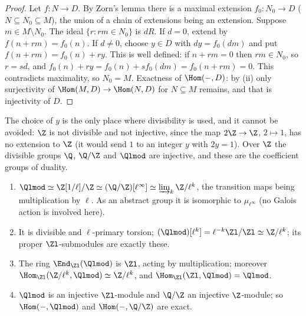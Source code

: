 \begin{proof}
Let $f\colon N\to D$. By Zorn's lemma there is a maximal extension $f_0\colon N_0\to D$ ($N\subseteq N_0\subseteq M$), the union of a chain of
extensions being an extension. Suppose $m\in M\setminus N_0$. The ideal $\{r:rm\in N_0\}$ is $dR$. If $d=0$, extend by $f(n+rm)=f_0(n)$. If
$d\ne0$, choose $y\in D$ with $dy=f_0(dm)$ and put $f(n+rm)=f_0(n)+ry$. This is well defined: if $n+rm=0$ then $rm\in N_0$, so $r=sd$, and
$f_0(n)+ry=f_0(n)+sf_0(dm)=f_0(n+rm)=0$. This contradicts maximality, so $N_0=M$. Exactness of $\Hom(-,D)$: by (ii) only
surjectivity of $\Hom(M,D)\to\Hom(N,D)$ for $N\subseteq M$ remains, and that is injectivity of $D$.
\end{proof}

The choice of $y$ is the only place where divisibility is used, and it cannot be avoided: $\Z$ is not divisible and not injective, since the
map $2\Z\to\Z$, $2\mapsto1$, has no extension to $\Z$ (it would send $1$ to an integer $y$ with $2y=1$). Over $\Z$ the divisible groups $\Q$, $\Q/\Z$
and $\Qlmod$ are injective, and these are the coefficient groups of duality.

\begin{proposition}\label{prop:modules:qlzl}
\begin{enumerate}[label=(\roman*)]
\item $\Qlmod\simeq\Z[1/\ell]/\Z\simeq(\Q/\Z)[\ell^\infty]\simeq\varinjlim_k\Z/\ell^k$, the transition maps being multiplication by $\ell$. As an abstract group
it is isomorphic to $\mu_{\ell^\infty}$ (no Galois action is involved here).
\item It is divisible and $\ell$-primary torsion; $(\Qlmod)[\ell^k]=\ell^{-k}\Zl/\Zl\simeq\Z/\ell^k$; its proper $\Zl$-submodules are exactly these.
\item The ring $\End_{\Zl}(\Qlmod)$ is $\Zl$, acting by multiplication; moreover $\Hom_{\Zl}(\Z/\ell^k,\Qlmod)\simeq\Z/\ell^k$, and
$\Hom_{\Zl}(\Zl,\Qlmod)=\Qlmod$.
\item $\Qlmod$ is an injective $\Zl$-module and $\Q/\Z$ an injective $\Z$-module; so $\Hom(-,\Qlmod)$ and $\Hom(-,\Q/\Z)$ are exact.
\end{enumerate}
\end{proposition}

